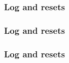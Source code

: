 \documentclass{beamer}
\begin{document}
    \begin{frame}
        \frametitle{Log and resets}
        \begin{figure}[H]
            \centering
            \noindent
        \end{figure}
    \end{frame}
    \begin{frame}
        \frametitle{Log and resets}
        \begin{figure}[H]
            \centering
            \noindent
        \end{figure}
    \end{frame}
    \begin{frame}
        \frametitle{Log and resets}
        \begin{figure}[H]
            \centering
            \noindent
        \end{figure}
    \end{frame}
\end{document}

